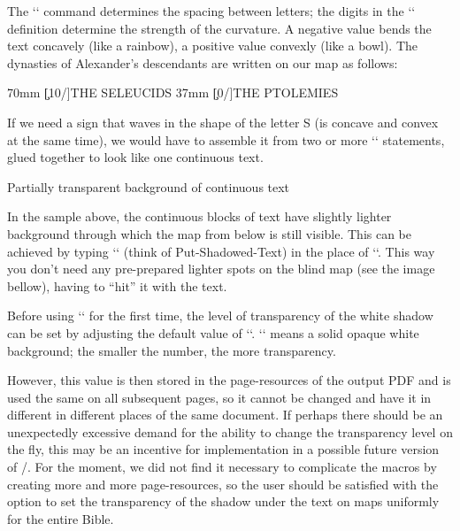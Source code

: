 {{{{The `\kern` command determines the spacing between letters; the digits in the `\pdfrotate` 
definition determine the strength of the curvature. A negative value bends the text concavely 
(like a rainbow), a positive value convexly (like a bowl).
The dynasties of Alexander's descendants are written on our map as follows:

\begtt
\puttext 62mm 70mm {\c[10/\kern7pt]{THE SELEUCIDS}}
\puttext 2mm 37mm {\c[0/\kern4pt]{THE PTOLEMIES}}
\endtt

If we need a sign that waves in the shape of the letter S (is concave and convex at 
the same time), we would have to assemble it from two or more `\puttext` statements, glued 
together to look like one continuous text. 




\secc[bkgrnd] Partially transparent background of continuous text

In the sample above, the continuous blocks of text have slightly lighter background through 
which the map from below is still visible.
This can be achieved by typing `\putstext` (think of Put-Shadowed-Text) in the place of 
`\puttext`. This way you don't need any pre-prepared lighter spots on the blind map (see the 
image bellow), having to “hit” it with the text. 


\medskip
\centerline{\picw=150pt }

\smallskip

Before using `\putstext` for the first time, the level of transparency of the white shadow can 
be set by adjusting the default value of `\def\shadowparameter{.1}`. 
`\def\shadowparameter{1}` means a solid opaque white background; the smaller the number, 
the more transparency. 

However, this value is then stored in the page-resources of the output PDF and is used 
the same  on all subsequent pages, so it cannot be changed and have it in different in 
different places of the same document. 
If perhaps there should be an unexpectedly excessive 
demand for the ability to change the transparency level on the fly, this may be an incentive for 
implementation in a possible future version of \OpBible/.
For the moment, we did not find it necessary to complicate the macros by creating more and more 
page-resources, so the user should be satisfied with the option to set the transparency of the 
shadow under the text on maps uniformly for the entire Bible.  

}}}}
